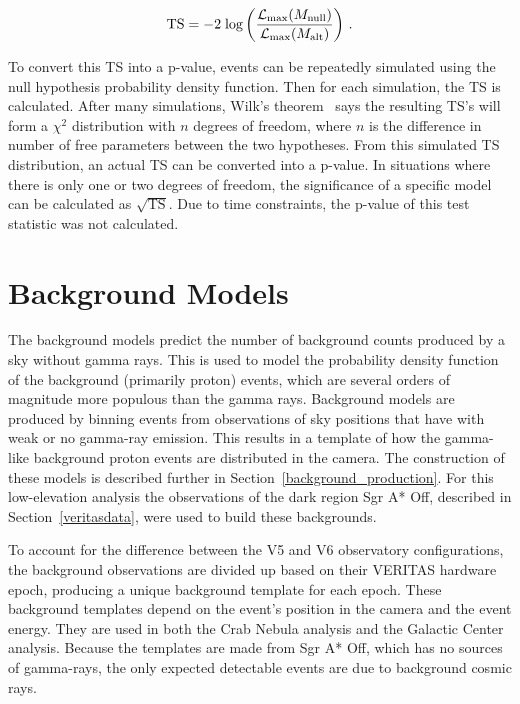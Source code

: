\begin{equation}\label{eqn:tscalc}
  \textrm{TS} = - 2 \; \textrm{log} \left (  \frac{ \mathcal{L}_{\textrm{max}}( M_\textrm{null} ) }{ \mathcal{L}_{\textrm{max}}( M_\textrm{alt} ) } \right ) \,.
\end{equation}

To convert this TS into a p-value, events can be repeatedly simulated using the null hypothesis probability density function.
Then for each simulation, the TS is calculated.
After many simulations, Wilk's theorem~\cite{wilks1938} says the resulting TS's will form a $\chi^2$ distribution with $n$ degrees of freedom, where $n$ is the difference in number of free parameters between the two hypotheses.
From this simulated TS distribution, an actual TS can be converted into a p-value.
In situations where there is only one or two degrees of freedom, the significance of a specific model can be calculated as $\sqrt{\textrm{TS}}$.
Due to time constraints, the p-value of this test statistic was not calculated.


\section{Background Models}\label{sec:bkgmodels}
The background models predict the number of background counts produced by a sky without gamma rays.
This is used to model the probability density function of the background (primarily proton) events, which are several orders of magnitude more populous than the gamma rays.
Background models are produced by binning events from observations of sky positions that have with weak or no gamma-ray emission.
This results in a template of how the gamma-like background proton events are distributed in the camera.
The construction of these models is described further in Section~\ref{background_production}.
For this low-elevation analysis the observations of the dark region Sgr A* Off, described in Section~\ref{veritasdata}, were used to build these backgrounds.

To account for the difference between the V5 and V6 observatory configurations, the background observations are divided up based on their VERITAS hardware epoch, producing a unique background template for each epoch.
These background templates depend on the event's position in the camera and the event energy.
They are used in both the Crab Nebula analysis and the Galactic Center analysis.
Because the templates are made from Sgr A* Off, which has no sources of gamma-rays, the only expected detectable events are due to background cosmic rays.


